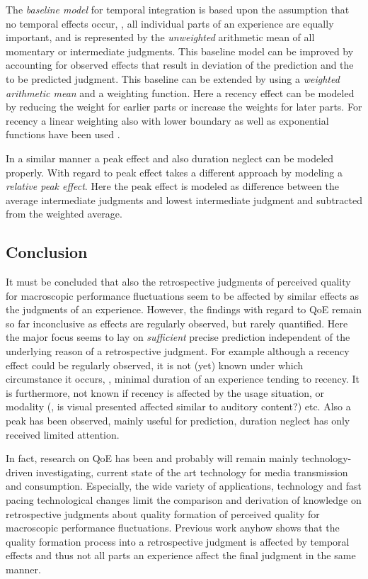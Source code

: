 The \emph{baseline model} for temporal integration is based upon the assumption that no temporal effects occur, \ie, all individual parts of an experience are equally important, and is represented by the \emph{unweighted} arithmetic mean of all momentary or intermediate judgments.
This baseline model can be improved by accounting for observed effects that result in deviation of the prediction and the to be predicted judgment.
This baseline can be extended by using a \emph{weighted arithmetic mean} and a weighting function.
Here a recency effect can be modeled by reducing the weight for earlier parts \citep[\cf,][]{rosenbluth_testing_1998, weiss_modeling_2009, hamberg_time-varying_1999} or increase the weights for later parts.
For recency a linear weighting also with lower boundary \citep[\eg,][]{weiss_modeling_2009} as well as exponential functions have been used \cite[\eg,][]{hamberg_time-varying_1999}.

In a similar manner a peak effect and also duration neglect can be modeled properly.
With regard to 	peak effect \citet{weiss_modeling_2009} takes a different approach by modeling a \emph{relative peak effect}.
Here the peak effect is modeled as difference between the average intermediate judgments and lowest intermediate judgment and subtracted from the weighted average.


\subsection{Conclusion}
It must be concluded that also the retrospective judgments of perceived quality for macroscopic performance fluctuations seem to be affected by similar effects as the judgments of an experience.
However, the findings with regard to \ac{QoE} remain so far inconclusive as effects are regularly observed, but rarely quantified.
Here the major focus seems to lay on \emph{sufficient} precise prediction independent of the underlying reason of a retrospective judgment.
For example although a recency effect could be regularly observed, it is not (yet) known under which circumstance it occurs, \eg, minimal duration of an experience tending to recency.
It is furthermore, not known if recency is affected by the usage situation, or modality (\eg, is visual presented affected similar to auditory content?) etc.
Also a peak has been observed, mainly useful for prediction, duration neglect has only received limited attention.

In fact, research on \ac{QoE} has been and probably will remain mainly technology-driven investigating, current state of the art technology for media transmission and consumption.
Especially, the wide variety of applications, technology and fast pacing technological changes limit the  comparison and derivation of knowledge on retrospective judgments about quality formation of perceived quality for macroscopic performance fluctuations.
Previous work anyhow shows that the quality formation process into a retrospective judgment is affected by temporal effects and thus not all parts an experience affect the final judgment in the same manner.